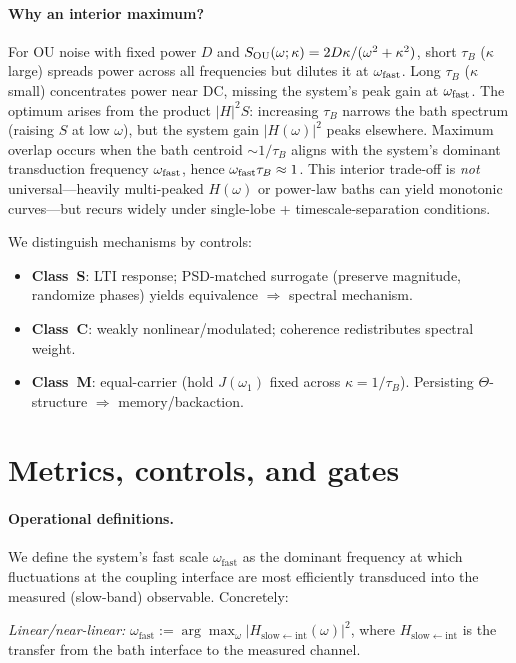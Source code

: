 \documentclass[11pt,letterpaper]{article}
\DeclareRobustCommand{\classS}{\textbf{Class~S}\xspace}
\DeclareRobustCommand{\classC}{\textbf{Class~C}\xspace}
\DeclareRobustCommand{\classM}{\textbf{Class~M}\xspace}
\begin{document}
\paragraph{Why an interior maximum?}
For OU noise with fixed power $D$ and $S_{\rm OU}(\omega;\kappa) = 2D\kappa/(\omega^2+\kappa^2)$, short $\tau_B$ ($\kappa$ large) spreads power across all frequencies but dilutes it at $\omega_{\rm fast}$. Long $\tau_B$ ($\kappa$ small) concentrates power near DC, missing the system's peak gain at $\omega_{\rm fast}$. The optimum arises from the product $|H|^2 S$: increasing $\tau_B$ narrows the bath spectrum (raising $S$ at low $\omega$), but the system gain $|H(\omega)|^2$ peaks elsewhere. Maximum overlap occurs when the bath centroid $\sim 1/\tau_B$ aligns with the system's dominant transduction frequency $\omega_{\rm fast}$, hence $\omega_{\rm fast} \tau_B \approx 1$. This interior trade-off is \emph{not} universal---heavily multi-peaked $H(\omega)$ or power-law baths can yield monotonic curves---but recurs widely under single-lobe + timescale-separation conditions.

We distinguish mechanisms by controls:
\begin{itemize}
\item \classS: LTI response; PSD-matched surrogate (preserve magnitude, randomize phases) yields equivalence $\Rightarrow$ spectral mechanism.
\item \classC: weakly nonlinear/modulated; coherence redistributes spectral weight.
\item \classM: equal-carrier (hold $J(\omega_1)$ fixed across $\kappa=1/\tau_B$). Persisting $\Theta$-structure $\Rightarrow$ memory/backaction.
\end{itemize}

\section{Metrics, controls, and gates}
\paragraph*{Operational definitions.}
We define the system's fast scale $\omega_{\mathrm{fast}}$ as the dominant frequency at which fluctuations at the coupling interface are most efficiently transduced into the measured (slow-band) observable. Concretely:

\emph{Linear/near-linear:} $\omega_{\mathrm{fast}} := \arg\max_{\omega} |H_{\mathrm{slow}\leftarrow\mathrm{int}}(\omega)|^2$, where $H_{\mathrm{slow}\leftarrow\mathrm{int}}$ is the transfer from the bath interface to the measured channel.
\end{document}
